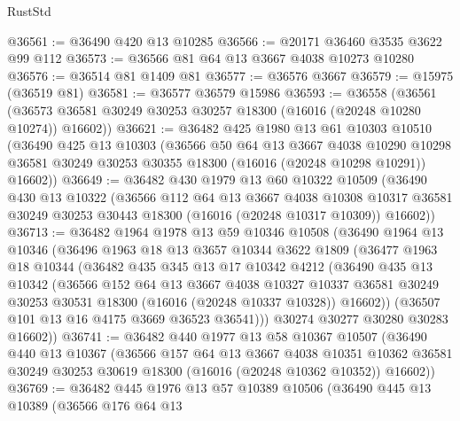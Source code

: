 \begin{lexlean}{RustStd}
\begin{coremodule}
@36561 := @36490 @420 @13 @10285
@36566 := @20171 @36460 @3535 @3622 @99 @112
@36573 := @36566 @81 @64 @13 @3667 @4038 @10273 @10280
@36576 := @36514 @81 @1409 @81
@36577 := @36576 @3667
@36579 := @15975 (@36519 @81)
@36581 := @36577 @36579 @15986
@36593 := @36558
    (@36561 (@36573 @36581 @30249 @30253 @30257 @18300 (@16016 (@20248 @10280 @10274)) @16602))
@36621 := @36482
    @425
    @1980
    @13
    @61
    @10303
    @10510
    (@36490
      @425
      @13
      @10303
      (@36566
        @50
        @64
        @13
        @3667
        @4038
        @10290
        @10298
        @36581
        @30249
        @30253
        @30355
        @18300
        (@16016 (@20248 @10298 @10291))
        @16602))
@36649 := @36482
    @430
    @1979
    @13
    @60
    @10322
    @10509
    (@36490
      @430
      @13
      @10322
      (@36566
        @112
        @64
        @13
        @3667
        @4038
        @10308
        @10317
        @36581
        @30249
        @30253
        @30443
        @18300
        (@16016 (@20248 @10317 @10309))
        @16602))
@36713 := @36482
    @1964
    @1978
    @13
    @59
    @10346
    @10508
    (@36490
      @1964
      @13
      @10346
      (@36496
        @1963
        @18
        @13
        @3657
        @10344
        @3622
        @1809
        (@36477
          @1963
          @18
          @10344
          (@36482
            @435
            @345
            @13
            @17
            @10342
            @4212
            (@36490
              @435
              @13
              @10342
              (@36566
                @152
                @64
                @13
                @3667
                @4038
                @10327
                @10337
                @36581
                @30249
                @30253
                @30531
                @18300
                (@16016 (@20248 @10337 @10328))
                @16602))
            (@36507 @101 @13 @16 @4175 @3669 @36523 @36541)))
        @30274
        @30277
        @30280
        @30283
        @16602))
@36741 := @36482
    @440
    @1977
    @13
    @58
    @10367
    @10507
    (@36490
      @440
      @13
      @10367
      (@36566
        @157
        @64
        @13
        @3667
        @4038
        @10351
        @10362
        @36581
        @30249
        @30253
        @30619
        @18300
        (@16016 (@20248 @10362 @10352))
        @16602))
@36769 := @36482
    @445
    @1976
    @13
    @57
    @10389
    @10506
    (@36490
      @445
      @13
      @10389
      (@36566
        @176
        @64
        @13

\end{coremodule}
\end{lexlean}
